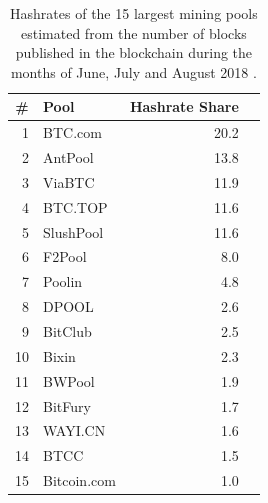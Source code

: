 \begin{table}[h!]
	\centering
	\begin{tabular}{rlrr}
		\toprule
		\multicolumn{1}{c}{\#} & \multicolumn{1}{l}{Pool} & \multicolumn{1}{c}{Hashrate Share} \\
		\midrule
		\num{1}                & BTC.com                  & \num{20.2}                         \\
		\num{2}                & AntPool                  & \num{13.8}                         \\
		\num{3}                & ViaBTC                   & \num{11.9}                         \\
		\num{4}                & BTC.TOP                  & \num{11.6}                         \\
		\num{5}                & SlushPool                & \num{11.6}                         \\
		\num{6}                & F2Pool                   & \num{8.0}                          \\
		\num{7}                & Poolin                   & \num{4.8}                          \\
		\num{8}                & DPOOL                    & \num{2.6}                          \\
		\num{9}                & BitClub                  & \num{2.5}                          \\
		\num{10}               & Bixin                    & \num{2.3}                          \\
		\num{11}               & BWPool                   & \num{1.9}                          \\
		\num{12}               & BitFury                  & \num{1.7}                          \\
		\num{13}               & WAYI.CN                  & \num{1.6}                          \\
		\num{14}               & BTCC                     & \num{1.5}                          \\
		\num{15}               & Bitcoin.com              & \num{1.0}                          \\
		\bottomrule
	\end{tabular}
	\caption[Estimation of the hashrate of the top largest mining pools]{Hashrates of the \num{15} largest mining pools estimated from the number of blocks published in the blockchain during the months of June, July and August \num{2018} \cite{stats_pools}.}
	\label{tab:pools}
\end{table}

